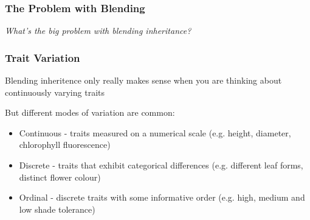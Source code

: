 \documentclass{beamer}
\begin{document}
\begin{frame}
		\frametitle{The Problem with Blending}
		
				\Huge \centering \emph{What's the big problem with blending inheritance?}
\end{frame}



\begin{frame}

	\frametitle{Trait Variation}

	Blending inheritence only really makes sense when you are thinking about continuously varying traits
	\vspace{5pt}

But different modes of variation are common:\pause
\begin{itemize}
	\item Continuous  - traits measured on a numerical scale (e.g. height, diameter, chlorophyll fluorescence) \pause
	\item Discrete - traits that exhibit categorical differences (e.g. different leaf forms, distinct flower colour) \pause
	\item Ordinal - discrete traits with some informative order (e.g. high, medium and low shade tolerance)
	
\end{itemize}

\end{frame}
\end{document}
